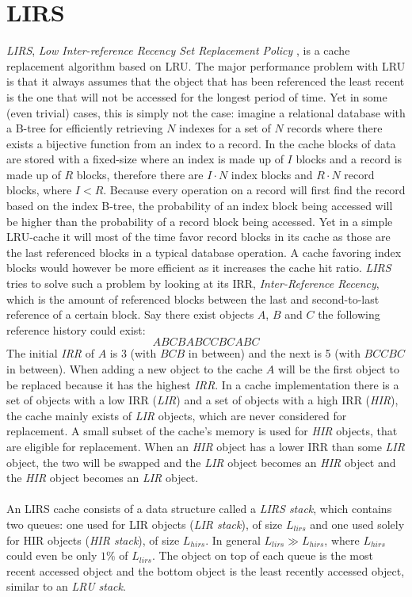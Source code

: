 \documentclass[pdftex,a4paper,12pt,twoside]{report}
\begin{document}
\section{LIRS}
\emph{LIRS}, \emph{Low Inter-reference Recency Set Replacement Policy} \citep{jiang2002lirs}, is a cache replacement algorithm based on LRU. 
The major performance problem with LRU is that it always assumes that the object that has been referenced the least recent is the one that will not be accessed for the longest period of time. Yet in some (even trivial) cases, this is simply not the case: imagine a relational database with a B-tree for efficiently retrieving $N$ indexes for a set of $N$ records where there exists a bijective function from an index to a record. In the cache blocks of data are stored with a fixed-size where an index is made up of $I$ blocks and a record is made up of $R$ blocks, therefore there are $I \cdot N$ index blocks and $R \cdot N$ record blocks, where $I < R$. Because every operation on a record will first find the record based on the index B-tree, the probability of an index block being accessed will be higher than the probability of a record block being accessed. Yet in a simple LRU-cache it will most of the time favor record blocks in its cache as those are the last referenced blocks in a typical database operation. A cache favoring index blocks would however be more efficient as it increases the cache hit ratio. \emph{LIRS} tries to solve such a problem by looking at its IRR, \emph{Inter-Reference Recency}, which is the amount of referenced blocks between the last and second-to-last reference of a certain block. Say there exist objects $A$, $B$ and $C$ the following reference history could exist:
\[ABCBABCCBCABC\]
The initial \emph{IRR} of $A$ is 3 (with $BCB$ in between) and the next is 5 (with $BCCBC$ in between). When adding a new object to the cache $A$ will be the first object to be replaced because it has the highest \emph{IRR}. In a cache implementation there is a set of objects with a low IRR (\emph{LIR}) and a set of objects with a high IRR (\emph{HIR}), the cache mainly exists of \emph{LIR} objects, which are never considered for replacement. A small subset of the cache's memory is used for \emph{HIR} objects, that are eligible for replacement. When an \emph{HIR} object has a lower IRR than some \emph{LIR} object, the two will be swapped and the \emph{LIR} object becomes an \emph{HIR} object and the \emph{HIR} object becomes an \emph{LIR} object.
\\\\
An LIRS cache consists of a data structure called a \emph{LIRS stack}, which contains two queues: one used for LIR objects (\emph{LIR stack}), of size $L_{lirs}$ and one used solely for HIR objects (\emph{HIR stack}), of size $L_{hirs}$. In general $L_{lirs} \gg L_{hirs}$, where $L_{hirs}$ could even be only $1\%$ of $L_{lirs}$. The object on top of each queue is the most recent accessed object and the bottom object is the least recently accessed object, similar to an \emph{LRU stack}.
\end{document}
